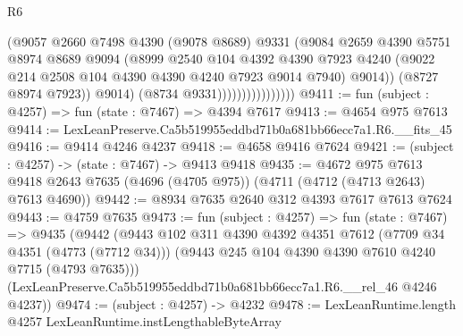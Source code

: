 \begin{lexlean}{R6}
\begin{coremodule}
                                    (@9057
                                      @2660
                                      @7498
                                      @4390
                                      (@9078 @8689)
                                      @9331
                                      (@9084
                                        @2659
                                        @4390
                                        @5751
                                        @8974
                                        @8689
                                        @9094
                                        (@8999
                                          @2540
                                          @104
                                          @4392
                                          @4390
                                          @7923
                                          @4240
                                          (@9022
                                            @214
                                            @2508
                                            @104
                                            @4390
                                            @4390
                                            @4240
                                            @7923
                                            @9014
                                            @7940)
                                          @9014))
                                      (@8727 @8974 @7923))
                                    @9014)
                                  (@8734 @9331))))))))))))))))
@9411 := fun (subject : @4257) => fun (state : @7467) => @4394 @7617
@9413 := @4654 @975 @7613
@9414 := LexLeanPreserve.Ca5b519955eddbd71b0a681bb66ecc7a1.R6.__fits_45
@9416 := @9414 @4246 @4237
@9418 := @4658 @9416 @7624
@9421 := (subject : @4257) -> (state : @7467) -> @9413 @9418
@9435 := @4672
    @975
    @7613
    @9418
    @2643
    @7635
    (@4696 (@4705 @975))
    (@4711 (@4712 (@4713 @2643) @7613 @4690))
@9442 := @8934 @7635 @2640 @312 @4393 @7617 @7613 @7624
@9443 := @4759 @7635
@9473 := fun (subject : @4257) =>
  fun (state : @7467) =>
  @9435
    (@9442
      (@9443
        @102
        @311
        @4390
        @4392
        @4351
        @7612
        (@7709 @34 @4351 (@4773 (@7712 @34)))
        (@9443 @245 @104 @4390 @4390 @7610 @4240 @7715 (@4793 @7635)))
      (LexLeanPreserve.Ca5b519955eddbd71b0a681bb66ecc7a1.R6.__rel_46 @4246 @4237))
@9474 := (subject : @4257) -> @4232
@9478 := LexLeanRuntime.length @4257 LexLeanRuntime.instLengthableByteArray

\end{coremodule}
\end{lexlean}
